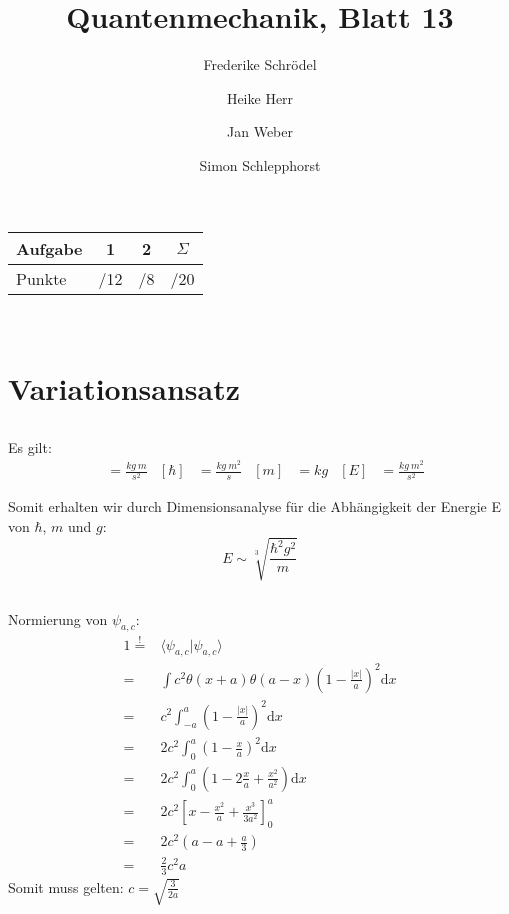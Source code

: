 \documentclass[11pt, ngerman, fleqn, DIV=15, headinclude]{scrartcl}
\title{Quantenmechanik, Blatt 13}
\author{
    Frederike Schrödel \and Heike Herr \and Jan Weber \and Simon Schlepphorst
}
\newcommand{\dup}{\mathrm d}
\begin{document}
\maketitle
\begin{center}
	\begin{tabular}{l|c|c|c}
		Aufgabe &1&2&$\Sigma$\\
		\hline
		Punkte &\quad /12 & \quad /8 & \quad /20
	\end{tabular}\\
\end{center}

\section{Variationsansatz}
\subsection{}
Es gilt:
	\begin{align*}
		[g]&=\frac{kg\ m}{s^2} & [\hbar]&=\frac{kg\ m^2}{s} & [m]&=kg & [E]&=\frac{kg\ m^2}{s^2}
	\end{align*}

Somit erhalten wir durch Dimensionsanalyse für die Abhängigkeit  der Energie E von $\hbar$, $m$ und $g$:
	\begin{equation*}
		E\sim \sqrt[3]{\frac{\hbar^2g^2}{m}}
	\end{equation*}

\subsection{}
	Normierung von $\psi_{a,c}$:
	\begin{align*}
		1\stackrel{!}{=}&\langle \psi_{a,c}| \psi_{a,c} \rangle \\
				=&\int c^2 \theta(x+a)\theta(a-x) \left(1-\frac{|x|}{a}\right)^2 \dup x \\
				=& c^2 \int_{-a}^a \left(1-\frac{|x|}{a}\right)^2 \dup x \\
				=& 2c^2 \int_0^a \left(1-\frac{x}{a}\right)^2 \dup x \\
				=& 2c^2\int_0^a \left(1-2\frac{x}{a}+\frac{x^2}{a^2}\right) \dup x \\
				=& 2c^2\left[x-\frac{x^2}{a}+\frac{x^3}{3a^2} \right]_0^a \\
				=&2c^2\left(a-a+\frac{a}{3}\right)\\
				=& \frac{2}{3}c^2a
	\end{align*}
	Somit muss gelten: $c= \sqrt{\frac{3}{2a}}$
	
\end{document}
